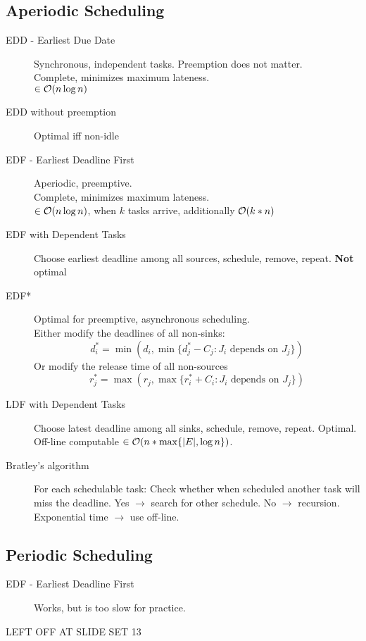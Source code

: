 \subsection*{Aperiodic Scheduling}
\begin{description}
	\item[EDD - Earliest Due Date] Synchronous, independent tasks. Preemption
	does not matter. \\ Complete, minimizes maximum lateness.\\ $\in \operatorname{\mathcal{O}}(n
	\log n)$
	\item[EDD without preemption] Optimal iff non-idle
	\item[EDF - Earliest Deadline First] Aperiodic, preemptive.\\ Complete,
	minimizes maximum lateness.\\ $\in \operatorname{\mathcal{O}}(n \log n)$, when $k$ tasks arrive,
	additionally $\operatorname{\mathcal{O}}(k*n)$
	\item[EDF with Dependent Tasks] Choose earliest deadline among all sources,
	schedule, remove, repeat. \textbf{Not} optimal
	\item[EDF*] Optimal for preemptive, asynchronous scheduling.\\
	Either modify the deadlines of all non-sinks:
	\[ d_i^* = \min(d_i, \min\{d_j^* - C_j : J_i \text{ depends on } J_j\}) \]
	Or modify the release time of all non-sources
	\[ r_j^* = \max(r_j, \max\{r_i^* + C_i : J_i \text{ depends on } J_j\}) \]
	\item[LDF with Dependent Tasks] Choose latest deadline among all sinks,
	schedule, remove, repeat. Optimal. Off-line computable $\in \operatorname{\mathcal{O}}(n * \max
	\{|E|, \log n\})$.
	\item[Bratley's algorithm] For each schedulable task: Check whether when
	scheduled another task will miss the deadline. Yes $\rightarrow$ search for
	other schedule. No $\rightarrow$ recursion. \\ 
	Exponential time $\rightarrow$ use off-line.
\end{description}

\subsection*{Periodic Scheduling}
\begin{description}
	\item[EDF - Earliest Deadline First] Works, but is too slow for practice.
	\item[LEFT OFF AT SLIDE SET 13]
\end{description}
